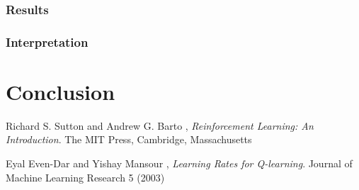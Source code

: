 \documentclass[11pt]{article}
\begin{document}
\subsubsection{Results}


\subsubsection{Interpretation}


\subsubsection{}

\section{Conclusion}

\begin{thebibliography}{9}

  Richard S. Sutton and Andrew G. Barto ,
  \emph{Reinforcement Learning: An Introduction}.
  The MIT Press, Cambridge, Massachusetts

  Eyal Even-Dar and Yishay Mansour ,
  \emph{Learning Rates for Q-learning}.
  Journal of Machine Learning Research 5 (2003)

\end{thebibliography}
\end{document}
